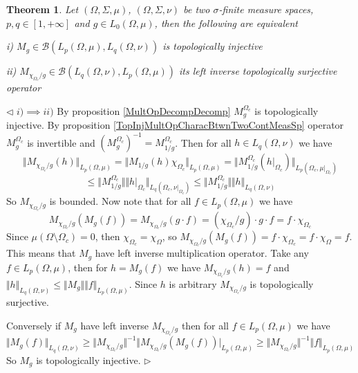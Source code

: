 \documentclass[12pt]{article}
\newtheorem{theorem}{Theorem}[subsection]
\newenvironment{proof}{\par $\triangleleft$}{$\triangleright$}
\begin{document}
\begin{theorem}\label{TopInjMultOpDescBtwnTwoMeasSp} Let $(\Omega,\Sigma,\mu)$, $(\Omega,\Sigma,\nu)$ be two $\sigma$-finite measure spaces, $p,q\in[1,+\infty]$ and $g\in L_0(\Omega,\mu)$, then the following are equivalent

i) $M_g\in\mathcal{B}(L_p(\Omega,\mu),L_q(\Omega,\nu))$ is topologically injective

ii) $M_{\chi_{\Omega_c}/g}\in\mathcal{B}(L_q(\Omega,\nu), L_p(\Omega,\mu))$ its left inverse topologically surjective operator
\end{theorem}
\begin{proof}
$i)\implies ii)$ By proposition \ref{MultOpDecompDecomp}  $M_g^{\Omega_c}$ is topologically injective. By proposition \ref{TopInjMultOpCharacBtwnTwoContMeasSp} operator $M_g^{\Omega_c}$ is invertible and $(M_g^{\Omega_c})^{-1}=M_{1/g}^{\Omega_c}$. Then for all $h\in L_q(\Omega,\nu)$ we have
$$
\Vert M_{\chi_{\Omega_c}/g}(h)\Vert_{L_p(\Omega,\mu)}=
\Vert M_{1/g}(h)\chi_{\Omega_c}\Vert_{L_p(\Omega,\mu)}=
\Vert M_{1/g}^{\Omega_c}(h|_{\Omega_c})\Vert_{L_p(\Omega_c,\mu|_{\Omega_c})}
$$
$$
\leq\Vert M_{1/g}^{\Omega_c}\Vert\Vert h|_{\Omega_c}\Vert_{L_q(\Omega_c,\nu|_{\Omega_c})}
\leq\Vert M_{1/g}^{\Omega_c}\Vert\Vert h\Vert_{L_q(\Omega,\nu)}
$$
So $M_{\chi_{\Omega_c}/g}$ is bounded. Now note that for all $f\in L_p(\Omega,\mu)$ we have
$$
M_{\chi_{\Omega_c}/g}(M_g(f))
=M_{\chi_{\Omega_c}/g}(g\cdot f)
=(\chi_{\Omega_c}/g)\cdot g\cdot f
=f\cdot\chi_{\Omega_c}
$$
Since $\mu(\Omega\setminus\Omega_c)=0$, then $\chi_{\Omega_c}=\chi_{\Omega}$, so $M_{\chi_{\Omega_c}/g}(M_g(f))=f\cdot\chi_{\Omega_c}=f\cdot\chi_{\Omega}=f$. This means that $M_g$ have left inverse multiplication operator. Take any $f\in L_p(\Omega,\mu)$, then for $h=M_g(f)$ we have $M_{\chi_{\Omega_c}/g}(h)=f$ and $\Vert h\Vert_{L_q(\Omega,\nu)}\leq\Vert M_g\Vert\Vert f\Vert_{L_p(\Omega,\mu)}$. Since $h$ is arbitrary $M_{\chi_{\Omega_c}/g}$ is topologically surjective.

Conversely if $M_g$ have left inverse $M_{\chi_{\Omega_c}/g}$ then for all $f\in L_p(\Omega,\mu)$ we have
$$
\Vert M_g(f)\Vert_{L_q(\Omega,\nu)}
\geq\Vert M_{\chi_{\Omega_c}/g}\Vert^{-1}\Vert M_{\chi_{\Omega_c}/g}(M_g(f))\vert_{L_p(\Omega,\mu)}
\geq\Vert M_{\chi_{\Omega_c}/g}\Vert^{-1}\Vert f\Vert_{L_p(\Omega,\mu)}
$$
So $M_g$ is topologically injective.
\end{proof}
\end{document}
